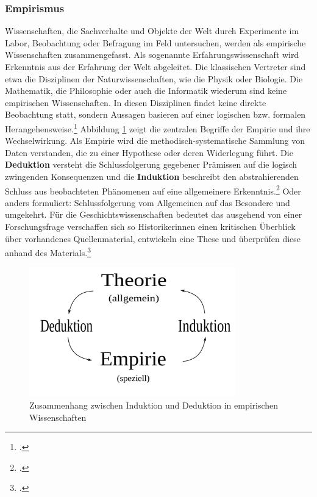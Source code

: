 \documentclass[12pt,a4paper]{article}
\begin{document}

\subsubsection{Empirismus}

Wissenschaften, die Sachverhalte und Objekte der Welt durch Experimente im Labor, Beobachtung oder Befragung im Feld untersuchen, werden als empirische Wissenschaften zusammengefasst. Als sogenannte Erfahrungswissenschaft wird Erkenntnis aus der Erfahrung der Welt abgeleitet. Die klassischen Vertreter sind etwa die Disziplinen der Naturwissenschaften, wie die Physik oder Biologie. Die Mathematik, die Philosophie oder auch die Informatik wiederum sind keine empirischen Wissenschaften. In diesen Disziplinen findet keine direkte Beobachtung statt, sondern Aussagen basieren auf einer logischen bzw. formalen Herangehensweise.\footcite[08.11.2019]{frommergrundbegriffe} Abbildung \ref{fig:empirismus} zeigt die zentralen Begriffe der Empirie und ihre Wechselwirkung. Als Empirie wird die methodisch-systematische Sammlung von Daten verstanden, die zu einer Hypothese oder deren Widerlegung führt. Die \textbf{Deduktion} versteht die Schlussfolgerung gegebener Prämissen auf die logisch zwingenden Konsequenzen und die \textbf{Induktion} beschreibt den abstrahierenden Schluss aus beobachteten Phänomenen auf eine allgemeinere Erkenntnis.\footcite[Siehe][]{chalmers2007wege}
Oder anders formuliert: Schlussfolgerung vom Allgemeinen auf das Besondere und umgekehrt. Für die Geschichtswissenschaften bedeutet das ausgehend von einer Forschungsfrage verschaffen sich so Historikerinnen einen kritischen Überblick über  vorhandenes Quellenmaterial, entwickeln eine These und überprüfen diese anhand des Materials.\footcite[][S.45-46]{jordan2018theorien}
\begin{figure}[H]
\centering
	\includegraphics[width=0.8\textwidth]{img/emprisimus.png}  
    \caption[Zusammenhang zwischen Induktion und Deduktion in empirischen Wissenschaften, de.wikipedia.org/wiki/Empirie, 09.11.2019.]{Zusammenhang zwischen Induktion und Deduktion in empirischen Wissenschaften} \label{fig:empirismus}
\end{figure}
\end{document}
